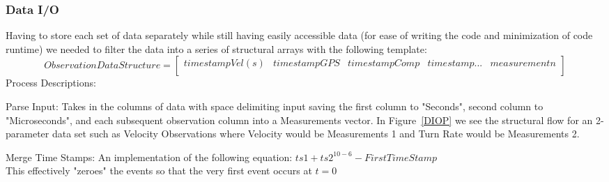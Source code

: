 		\subsubsection{Data I/O}
			Having to store each set of data separately while still having easily accessible data (for ease of writing the code and minimization of code runtime) we needed to filter the data into a series of structural arrays with the following template:
			$$Observation Data Structure =
			\begin{bmatrix}
			timestampVel (s) & timestampGPS & timestampComp & timestamp... & measurement n\\
			\end{bmatrix}
			$$
			Process Descriptions:
			\begin{list}{)~}{}
				\item Parse Input: Takes in the columns of data with space delimiting input saving the first column to "Seconds", second column to "Microseconds", and each subsequent observation column into a Measurements vector. In Figure~\ref{DIOP} we see the structural flow for an 2-parameter data set such as Velocity Observations where Velocity would be Measurements 1 and Turn Rate would be Measurements 2.
				\item Merge Time Stamps: An implementation of the following equation: $ts1+ts2^{10-6} - First Time Stamp$\\
				This effectively "zeroes" the events so that the very first event occurs at $t = 0$		
			\end{list}
			
